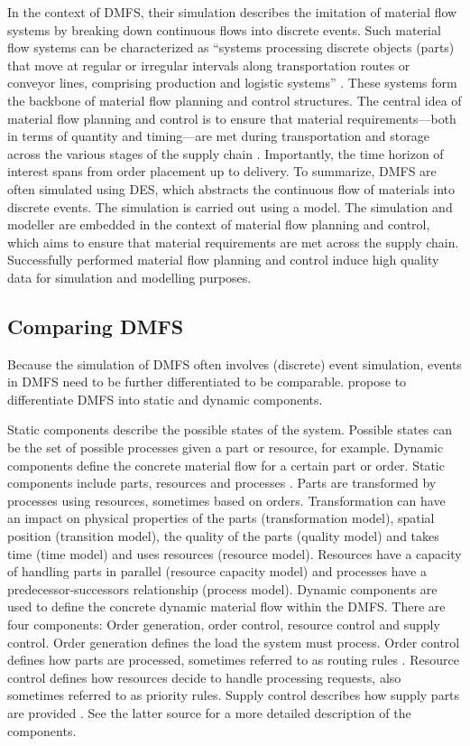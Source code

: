 In the context of DMFS, their simulation describes the imitation of material flow systems by breaking down continuous flows into discrete events. Such material flow systems can be characterized as “systems processing discrete objects (parts) that move at regular or irregular intervals along transportation routes or conveyor lines, comprising production and logistic systems” \autocite{Arnold2006,schwede2024learning}. These systems form the backbone of material flow planning and control structures. The central idea of material flow planning and control is to ensure that material requirements—both in terms of quantity and timing—are met during transportation and storage across the various stages of the supply chain \autocite{Gehr2007}. Importantly, the time horizon of interest spans from order placement up to delivery.
To summarize, DMFS are often simulated using DES, which abstracts the continuous flow of materials into discrete events. The simulation is carried out using a model. The simulation and modeller are embedded in the context of material flow planning and control, which aims to ensure that material requirements are met across the supply chain. Successfully performed material flow planning and control induce high quality data for simulation and modelling purposes.

\subsection{Comparing DMFS}
\label{sec:comparing-dmfs}
Because the simulation of DMFS often involves (discrete) event simulation, events in DMFS need to be further differentiated to be comparable. \Autocite{Arnold2006} propose to differentiate DMFS into static and dynamic components.

Static components describe the possible states of the system. Possible states can be the set of possible processes given a part or resource, for example. Dynamic components define the concrete material flow for a certain part or order.
Static components include parts, resources and processes \autocite{schwede2024learning}. Parts are transformed by processes using resources, sometimes based on orders. Transformation can have an impact on physical properties of the parts (transformation model), spatial position (transition model), the quality of the parts (quality model) and takes time (time model) and uses resources (resource model). Resources have a capacity of handling parts in parallel (resource capacity model) and processes have a predecessor-successors relationship (process model).
Dynamic components are used to define the concrete dynamic material flow within the DMFS. There are four components: Order generation, order control, resource control and supply control. Order generation defines the load the system must process. Order control defines how parts are processed, sometimes referred to as routing rules \autocite{mildeautomated}. Resource control defines how resources decide to handle processing requests, also sometimes referred to as priority rules. Supply control describes how supply parts are provided \autocite{mildeautomated,schwede2024learning}. See the latter source for a more detailed description of the components.


